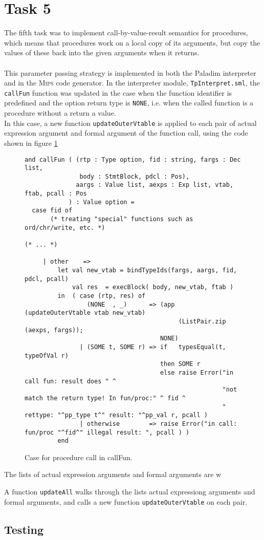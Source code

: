 \section{Task 5}
The fifth task was to implement call-by-value-result semantics for procedures,
which means that procedures work on a local copy of its arguments, but copy the
values of these back into the given arguments when it returns.\\
\\
This parameter passing strategy is implemented in both the \textsf{Paladim}
interpreter and in the \textsc{Mips} code generator. In the interpreter module,
\verb|TpInterpret.sml|, the \verb|callFun| function was updated in the case when
the function identifier is predefined and the  option return type is
\verb|NONE|, i.e. when the called function is a procedure without a return a
value.\\
In this case, a new function \verb|updateOuterVtable| is applied to each pair of
actual expression argument and formal argument of the function call, using the
code shown in figure \ref{fig_callFun}
 
\begin{figure}[H]
  \begin{lstlisting}[style=MLStyle]
and callFun ( (rtp : Type option, fid : string, fargs : Dec list,
               body : StmtBlock, pdcl : Pos),
              aargs : Value list, aexps : Exp list, vtab, ftab, pcall : Pos
            ) : Value option =
  case fid of
       (* treating "special" functions such as ord/chr/write, etc. *)

(* ... *)

     | other    =>
         let val new_vtab = bindTypeIds(fargs, aargs, fid, pdcl, pcall)
             val res  = execBlock( body, new_vtab, ftab )
         in  ( case (rtp, res) of
                 (NONE  , _)      => (app (updateOuterVtable vtab new_vtab)
                                          (ListPair.zip (aexps, fargs));
                                     NONE)
               | (SOME t, SOME r) => if   typesEqual(t, typeOfVal r) 
                                     then SOME r
                                     else raise Error("in call fun: result does " ^
                                                      "not match the return type! In fun/proc:" ^ fid ^ 
                                                      " rettype: "^pp_type t^" result: "^pp_val r, pcall )
               | otherwise        => raise Error("in call: fun/proc "^fid^" illegal result: ", pcall ) )
         end
  \end{lstlisting}
  \caption{Case for procedure call in callFun.}
  \label{fig_callFun}
\end{figure}
 




The lists of actual expression arguments and formal arguments are w

A function \verb|updateAll| walks through the lists actual expressiong
arguments and formal arguments, and calls a new function
\verb|updateOuterVtable| on each pair.

\subsection{Testing}
